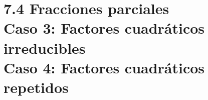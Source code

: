 \documentclass{book}
\begin{document}

\chapter{7.4 Fracciones parciales \\ Caso 3: Factores cuadráticos irreducibles \\ Caso 4: Factores cuadráticos repetidos } 

\end{document}
